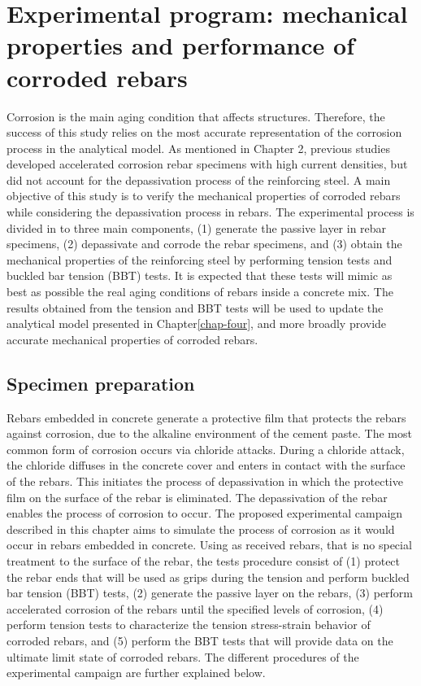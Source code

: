 \chapter{Experimental program: mechanical properties and performance of corroded rebars}
\label{chap-three}

Corrosion is the main aging condition that affects structures. Therefore, the success of this study relies on the most accurate representation of the corrosion process in the analytical model. As mentioned in Chapter 2, previous studies developed accelerated corrosion rebar specimens with high current densities, but did not account for the depassivation process of the reinforcing steel. A main objective of this study is to verify the mechanical properties of corroded rebars while considering the depassivation process in rebars. The experimental process is divided in to three main components, (1) generate the passive layer in rebar specimens, (2) depassivate and corrode the rebar specimens, and (3) obtain the mechanical properties of the reinforcing steel by performing tension tests and buckled bar tension (BBT) tests. It is expected that these tests will mimic as best as possible the real aging conditions of rebars inside a concrete mix. The results obtained from the tension and BBT tests will be used to update the analytical model presented in Chapter\ref{chap-four}, and more broadly provide accurate mechanical properties of corroded rebars.

\section{Specimen preparation}

Rebars embedded in concrete generate a protective film that protects the rebars against corrosion, due to the alkaline environment of the cement paste. The most common form of corrosion occurs via chloride attacks. During a chloride attack, the chloride diffuses in the concrete cover and enters in contact with the surface of the rebars. This initiates the process of depassivation in which the protective film on the surface of the rebar is eliminated. The depassivation of the rebar enables the process of corrosion to occur. The proposed experimental campaign described in this chapter aims to simulate the process of corrosion as it would occur in rebars embedded in concrete. Using as received rebars, that is no special treatment to the surface of the rebar, the tests procedure consist of (1) protect the rebar ends that will be used as grips during the tension and perform buckled bar tension (BBT) tests, (2)  generate the passive layer on the rebars, (3) perform accelerated corrosion of the rebars until the specified levels of corrosion, (4) perform tension tests to characterize the tension stress-strain behavior of corroded rebars, and (5) perform the BBT tests that will provide data on the ultimate limit state of corroded rebars. The different procedures of the experimental campaign are further explained below.


